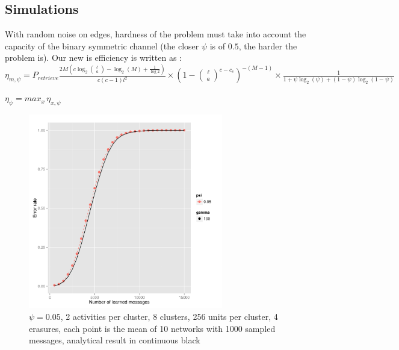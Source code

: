 \documentclass[english,10pt,twocolumn]{IEEEtran}
\theoremstyle{definition}
\begin{document}
	\subsection{Simulations}
	
	With random noise on edges, hardness of the problem must take into account the capacity of the binary symmetric channel (the closer $\psi$ is of $0.5$, the harder the problem is). Our new is efficiency is written as :  	
	$\eta_{m, \psi} = P_{retrieve}  \frac{2 M \left(c \log_2{\ell \choose a } - \log_2(M) + \frac{1}{\log 2} \right)}{c(c-1)l^2} \times (1-{\ell \choose a}^{c - c_e})^{-(M-1)} \times \frac{1}{1 + \psi \log_2(\psi) +(1-\psi) \log_2(1-\psi)} $
	
	$\eta_\psi = max_x \, \eta_{x, \psi}$
	\begin{figure}[!htb]
		\includegraphics[width=8.5cm]{Courbes/thpsi_c8l256e4}
		\caption{$\psi = 0.05$, 2 activities per cluster, 8 clusters, 256 units per cluster, 4 erasures, each point is the mean of 10 networks with 1000 sampled messages, analytical result in continuous black}
		\label{psith}
	\end{figure}
	
\end{document}
